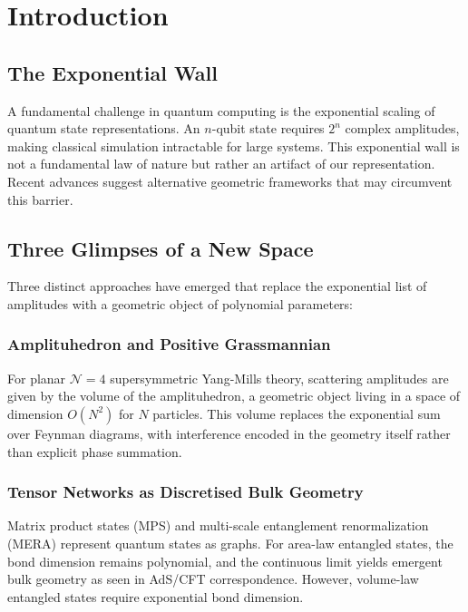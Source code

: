 \section{Introduction}

\subsection{The Exponential Wall}

A fundamental challenge in quantum computing is the exponential scaling of quantum state representations. An $n$-qubit state requires $2^n$ complex amplitudes, making classical simulation intractable for large systems. This exponential wall is not a fundamental law of nature but rather an artifact of our representation. Recent advances suggest alternative geometric frameworks that may circumvent this barrier.

\subsection{Three Glimpses of a New Space}

Three distinct approaches have emerged that replace the exponential list of amplitudes with a geometric object of polynomial parameters:

\subsubsection{Amplituhedron and Positive Grassmannian}

For planar $\mathcal{N}=4$ supersymmetric Yang-Mills theory, scattering amplitudes are given by the volume of the amplituhedron, a geometric object living in a space of dimension $O(N^2)$ for $N$ particles. This volume replaces the exponential sum over Feynman diagrams, with interference encoded in the geometry itself rather than explicit phase summation.

\subsubsection{Tensor Networks as Discretised Bulk Geometry}

Matrix product states (MPS) and multi-scale entanglement renormalization (MERA) represent quantum states as graphs. For area-law entangled states, the bond dimension remains polynomial, and the continuous limit yields emergent bulk geometry as seen in AdS/CFT correspondence. However, volume-law entangled states require exponential bond dimension.

